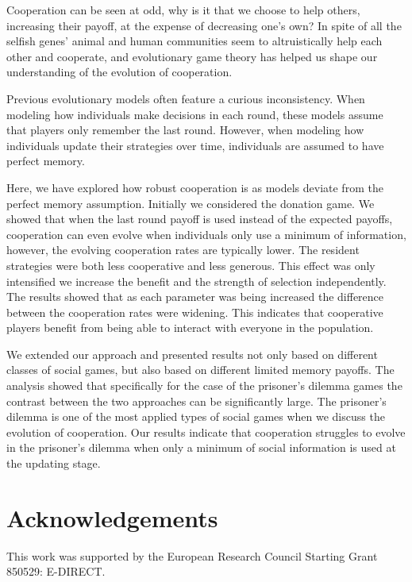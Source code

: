 \documentclass[11pt]{article}
\theoremstyle{plainCl1}
\theoremstyle{plainCl2}
\begin{document}
Cooperation can be seen at odd, why is it that we choose to help others,
increasing their payoff, at the expense of decreasing one's own? In spite of all
the selfish genes' animal and human communities seem to altruistically help each
other and cooperate, and evolutionary game theory has helped us shape our
understanding of the evolution of cooperation.

Previous evolutionary models often feature a curious inconsistency. When
modeling how individuals make decisions in each round, these models assume that
players only remember the last round. However, when modeling how individuals
update their strategies over time, individuals are assumed to have perfect
memory.

Here, we have explored how robust cooperation is as models deviate from the
perfect memory assumption. Initially we considered the donation game. We showed
that when the last round payoff is used instead of the expected payoffs,
cooperation can even evolve when individuals only use a minimum of information,
however, the evolving cooperation rates are typically lower. The resident
strategies were both less cooperative and less generous. This effect was only
intensified we increase the benefit and the strength of selection independently.
The results showed that as each parameter was being increased the difference
between the cooperation rates were widening. This indicates that cooperative
players benefit from being able to interact with everyone in the population.

We extended our approach and presented results not only based on different
classes of social games, but also based on different limited memory payoffs. The
analysis showed that specifically for the case of the prisoner's dilemma games
the contrast between the two approaches can be significantly large. The
prisoner's dilemma is one of the most applied types of social games when we
discuss the evolution of cooperation. Our results indicate that cooperation
struggles to evolve in the prisoner's dilemma when only a minimum of social
information is used at the updating stage.

\section{Acknowledgements}

This work was supported by the European Research Council Starting Grant 850529:
E-DIRECT.



\end{document}
